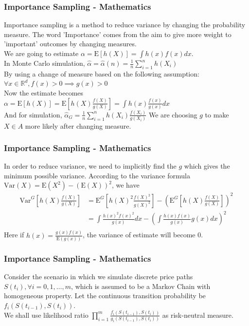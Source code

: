 \documentclass{beamer}
\begin{document}
\begin{frame}
\frametitle{Importance Sampling - Mathematics}
Importance sampling is a method to reduce variance by changing the probability measure. The word 'Importance' comes from the aim to give more weight to 'important' outcomes by changing measures.\\
We are going to estimate $\alpha = \mathrm{E}[h(X)] = \int h(x)f(x) dx$.\\
In Monte Carlo simulation, $\hat{\alpha} = \hat{\alpha}(n) = \frac{1}{n} \sum_{i=1}^{n} h(X_{i})$\\
By using a change of measure based on the following assumption:
$\forall x \in \mathbb{R}^{d}, f(x) > 0 \implies g(x) > 0$\\
Now the estimate becomes $\alpha = \mathrm{E}[h(X)] = \mathrm{E}[h(X)\frac{f(X)}{g(X)}] = \int h(x)\frac{f(x)}{g(x)} dx$\\
And for simulation, $\hat{\alpha}_{G} = \frac{1}{n} \sum_{i=1}^{n} h(X_{i})\frac{f(X_{i})}{g(X_{i})}$
We are choosing $g$ to make ${X \in A}$ more likely after changing measure.
\end{frame}

\begin{frame}
\frametitle{Importance Sampling - Mathematics}
In order to reduce variance, we need to implicitly find the $g$ which gives the minimum possible variance. According to the variance formula $\mathrm{Var}(X) = \mathrm{E}(X^{2}) - (\mathrm{E}(X))^{2} $, we have\\
\begin{equation*}
\begin{split}
\mathrm{Var}^{G}[h(X)\frac{f(X)}{g(X)}] &= \mathrm{E}^{G}[h(X)^{2}\frac{f(X)^{2}}{g(X)^{2}}] - (\mathrm{E}^{G}[h(X)\frac{f(X)}{g(X)}])^{2}\\
&= \int \frac{h(x)^{2}f(x)^{2}}{g(x)} dx - (\int \frac{h(x)f(x)}{g(x)}g(x) dx)^{2}\\
\end{split}
\end{equation*}
Here if $h(x) = \frac{g(x)f(x)}{\mathrm{E}(g(x))}$, the variance of estimate will become 0.
\end{frame}

\begin{frame}
\frametitle{Importance Sampling - Mathematics}
Consider the scenario in which we simulate discrete price paths $S(t_{i}), \forall i = 0, 1, \dots, m$, which is assumed to be a Markov Chain with homogeneous property. Let the continuous transition probability be $f_{i}(S(t_{i-1}),S(t_{i}))$.\\[3mm]
We shall use likelihood ratio $\prod_{i=1}^{m} \frac{f_{i}(S(t_{i-1}),S(t_{i}))}{g_{i}(S(t_{i-1}),S(t_{i}))}$ as risk-neutral measure.
\end{frame}
\end{document}

